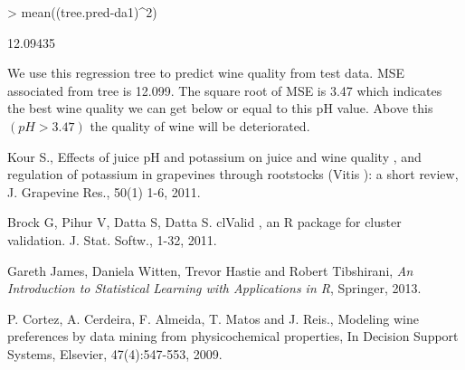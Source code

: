 \documentclass[12pt]{article}
\begin{document}
\begin{Schunk}
\begin{Sinput}
> mean((tree.pred-da1)^2)
\end{Sinput}
\begin{Soutput}
[1] 12.09435
\end{Soutput}
\end{Schunk}
We use this regression tree to predict wine quality from test data.
MSE associated from tree is 12.099.
The square root of MSE is 3.47 which indicates the best wine quality we can get below or equal to this pH value.
Above this $(pH>3.47)$ the quality of wine will be deteriorated.


\begin{thebibliography}{s99}
Kour S., Effects of juice pH and potassium on juice and wine quality , and regulation of potassium in grapevines through rootstocks (Vitis ): a short review, J. Grapevine Res., 50(1) 1-6, 2011.

Brock G, Pihur V, Datta S, Datta S. clValid , an R package for cluster validation. J. Stat. Softw., 
1-32, 2011.

Gareth James, Daniela Witten, Trevor Hastie and Robert Tibshirani, {\it An Introduction to
Statistical Learning with Applications in R}, Springer, 2013.

P. Cortez, A. Cerdeira, F. Almeida, T. Matos and J. Reis., Modeling wine preferences by data mining from physicochemical properties, In Decision Support Systems, Elsevier, 47(4):547-553, 2009.
\end{thebibliography}
\end{document}
